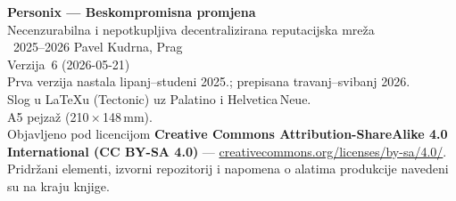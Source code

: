\thispagestyle{empty}
\ifdefined\printmode\vspace*{\fill}\else{}\fi
\begin{flushleft}\small\sffamily
\textbf{Personix --- Beskompromisna promjena}\\[0.3em]
Necenzurabilna i nepotkupljiva decentralizirana reputacijska mreža\\[1.4em]

\textcopyright\ 2025--2026 Pavel Kudrna, Prag\\[0.4em]

Verzija~6 (2026-05-21)\\
Prva verzija nastala lipanj--studeni 2025.; prepisana travanj--svibanj 2026.\\[1.4em]

Slog u \LaTeX{}u (Tectonic) uz Palatino i Helvetica\,Neue.\\
A5 pejzaž (210\,$\times$\,148\,mm).\\[1.4em]

Objavljeno pod licencijom \textbf{Creative Commons Attribution-ShareAlike 4.0
International (CC BY-SA 4.0)} ---
\href{https://creativecommons.org/licenses/by-sa/4.0/}{creativecommons.org/licenses/by-sa/4.0/}.
Pridržani elementi, izvorni repozitorij i napomena o alatima produkcije
navedeni su na kraju knjige.
\end{flushleft}
\ifdefined\printmode\else{}\fi
\clearpage
